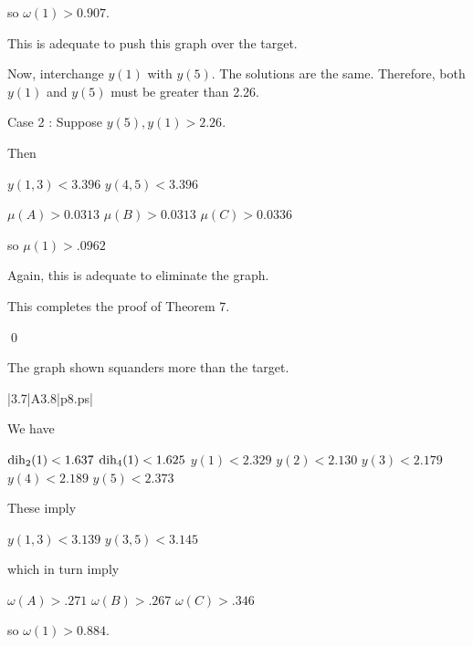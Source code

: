 so $\omega(1)>0.907$.  

This is adequate to push this graph over the target.

Now, interchange $y(1)$ with $y(5)$.  The solutions are the same.
Therefore, both $y(1)$ and $y(5)$ must be greater than 2.26.



Case 2 : Suppose $y(5),y(1)>2.26.$


Then

$y(1,3)<3.396$ \newline
$y(4,5)<3.396$ \newline

$\mu(A)>0.0313$ \newline
$\mu(B)>0.0313$ \newline
$\mu(C)>0.0336$ \newline

so $\mu(1)>.0962$

Again, this is adequate to eliminate the graph.

This completes the proof of Theorem 7.

\qed


\bigskip



 The graph shown 
squanders more than the target.  \endproclaim

\gram|3.7|A3.8|p8.ps|  %

We have 

$\operatorname{dih}_2(1) < 1.637$ \newline
$\operatorname{dih}_4(1) < 1.625$ \newline
$y(1)<2.329$ \newline
$y(2)<2.130$ \newline
$y(3)<2.179$ \newline
$y(4)<2.189$ \newline
$y(5)<2.373$ \newline

These imply 

$y(1,3)<3.139$ \newline
$y(3,5)<3.145$ \newline

which in turn imply

$\omega(A)>.271$ \newline
$\omega(B)>.267$ \newline
$\omega(C)>.346$ \newline

so $\omega(1)>0.884$.

